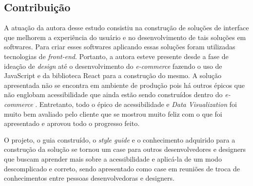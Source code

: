  
\subsection{Contribuição}
{

 A atuação da autora desse estudo consistiu na construção de soluções de interface que melhorem a experiência do usuário e no desenvolvimento de tais soluções em softwares. Para criar esses softwares aplicando essas soluções foram utilizadas tecnologias de \textit{front-end}. Portanto, a autora esteve presente desde a fase de ideação de \textit{design} até o desenvolvimento do \textit{e-commerce} fazendo o uso de JavaScript e da biblioteca React para a construção do mesmo. A solução apresentada não se encontra em ambiente de produção pois há outros épicos que não englobam acessibilidade que ainda estão sendo construídos dentro do \textit{e-commerce} . Entretanto, todo o épico de acessibilidade e \textit{Data Visualization} foi muito bem avaliado pelo cliente que se mostrou muito feliz com o que foi apresentado e aprovou todo o progresso feito.

O projeto, o guia construído, o \textit{style guide} e o conhecimento adquirido para a construção da solução se tornou um case para outros desenvolvedores e designers que buscam aprender mais sobre a acessibilidade e aplicá-la de um modo descomplicado e correto, sendo apresentado como case em reuniões de troca de conhecimentos entre pessoas desenvolvedoras e designers.  

}